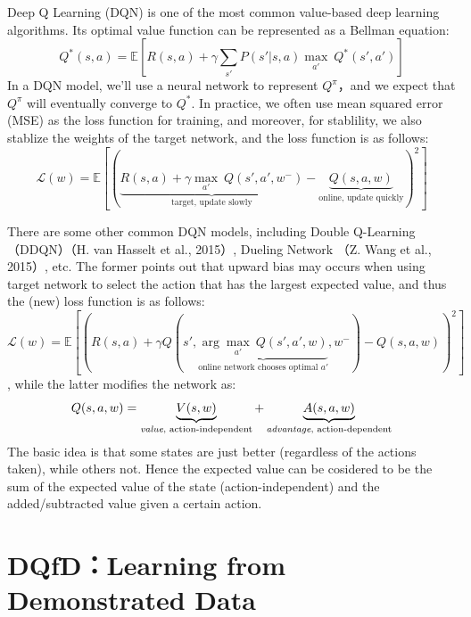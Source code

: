 \documentclass{article}
\begin{document}
Deep Q Learning (DQN) is one of the most common value-based deep learning algorithms. Its optimal value function can be represented as a Bellman equation:
\[Q^*(s,a) = \mathbb{E}\left[R(s,a) + \gamma \sum_{s'}P(s'|s,a) \underset{a'}\max\ Q^*(s',a')\right]\]
In a DQN model, we'll use a neural network to represent $Q^\pi$，and we expect that $Q^\pi$ will eventually converge to $Q^*$. In practice, we often use mean squared error (MSE) as the loss function for training, and moreover, for stablility, we also stablize the weights of the target network, and the loss function is as follows:
\[\mathcal{L}(w) = \mathbb{E}\left[\left(\underbrace{R(s,a) + \gamma \underset{a'}\max\ Q(s',a', w^-)}_{\text{target, update slowly}} - \underbrace{Q(s,a,w)}_{\text{online, update quickly}}\right)^2\right]\]
\par
There are some other common DQN models, including Double Q-Learning（DDQN）（H. van Hasselt et al., 2015）\cite{DBLP:journals/corr/HasseltGS15}, Dueling Network （Z. Wang et al., 2015）\cite{DBLP:journals/corr/WangFL15}, etc. The former points out that upward bias may occurs when using target network to select the action that has the largest expected value, and thus the (new) loss function is as follows:
\[\mathcal{L}(w) = \mathbb{E}\left[\left(R(s,a) + \gamma Q(s',\underbrace{\arg \underset{a'}\max\ Q(s',a',w)}_{\text{online network chooses optimal } a'}, w^-) - Q(s,a,w)\right)^2\right]\], while the latter modifies the network as:
\[Q(s,a,w) = \underbrace{V(s,w)}_{\text{\emph{value}, action-independent}} + \underbrace{A(s,a,w)}_{\text{\emph{advantage}, action-dependent}}\]
The basic idea is that some states are just better (regardless of the actions taken), while others not. Hence the expected value can be cosidered to be the sum of the expected value of the state (action-independent) and the added/subtracted value given a certain action.


\section{DQfD：Learning from Demonstrated Data}
\end{document}
